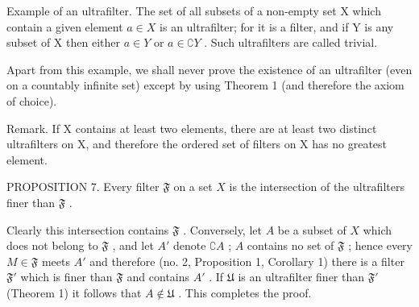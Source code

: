 Example of an ultrafilter. The set of all subsets of a non-empty set X which contain a given element \(a \in X\) is an ultrafilter; for it is a filter, and if Y is any subset of X then either \(a \in Y\) or \(a \in \complement Y\) . Such ultrafilters are called trivial.

Apart from this example, we shall never prove the existence of an ultrafilter (even on a countably infinite set) except by using Theorem 1 (and therefore the axiom of choice).

Remark. If X contains at least two elements, there are at least two distinct ultrafilters on X, and therefore the ordered set of filters on X has no greatest element.

PROPOSITION 7. Every filter \(\mathfrak{F}\) on a set \(X\) is the intersection of the ultrafilters finer than \(\mathfrak{F}\) .

Clearly this intersection contains \(\mathfrak{F}\) . Conversely, let \(A\) be a subset of \(X\) which does not belong to \(\mathfrak{F}\) , and let \(A'\) denote \(\complement A\) ; \(A\) contains no set of \(\mathfrak{F}\) ; hence every \(M \in \mathfrak{F}\) meets \(A'\) and therefore (no. 2, Proposition 1, Corollary 1) there is a filter \(\mathfrak{F}'\) which is finer than \(\mathfrak{F}\) and contains \(A'\) . If \(\mathfrak{U}\) is an ultrafilter finer than \(\mathfrak{F}'\) (Theorem 1) it follows that \(A \notin \mathfrak{U}\) . This completes the proof.

